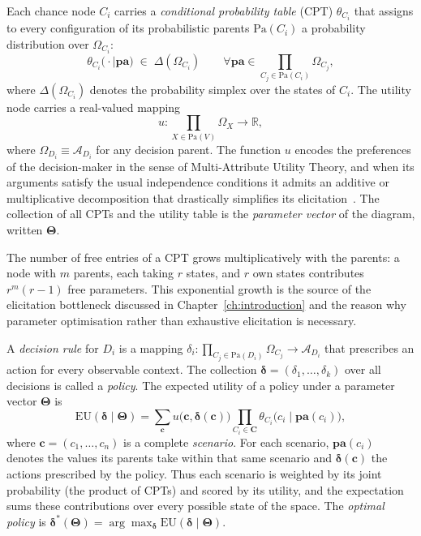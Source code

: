 Each chance node $C_i$ carries a \emph{conditional probability
table} (CPT) $\theta_{C_i}$ that assigns to every configuration of
its probabilistic parents $\mathrm{Pa}(C_i)$ a probability distribution over
$\Omega_{C_i}$:
\[
   \theta_{C_i}\bigl(\cdot \mid \mathbf{pa}\bigr) \;\in\;
   \Delta(\Omega_{C_i})
   \qquad
   \forall \mathbf{pa}\in\prod_{C_j\in\mathrm{Pa}(C_i)}\Omega_{C_j},
\]
where $\Delta(\Omega_{C_i})$ denotes the probability simplex over the
states of $C_i$. The utility node carries a real-valued mapping
\[
   u : \prod_{X\in\mathrm{Pa}(V)}\Omega_X \longrightarrow \mathbb{R},
\]
where $\Omega_{D_i}\equiv\mathcal{A}_{D_i}$ for any decision parent.
The function $u$ encodes the preferences of the decision-maker in
the sense of Multi-Attribute Utility Theory, and when its arguments
satisfy the usual independence conditions it admits an additive or
multiplicative decomposition that drastically simplifies its
elicitation~\cite{riosinsua2002maut}. The collection of all CPTs
and the utility table is the \emph{parameter vector} of the
diagram, written $\boldsymbol{\Theta}$.

\begin{remark}
\label{rem:explosion}
The number of free entries of a CPT grows multiplicatively with the
parents: a node with $m$ parents, each taking $r$ states, and $r$
own states contributes $r^{m}(r-1)$ free parameters. This
exponential growth is the source of the elicitation bottleneck
discussed in Chapter~\ref{ch:introduction} and the reason why
parameter optimisation rather than exhaustive elicitation is
necessary.
\end{remark}

A \emph{decision rule} for $D_i$ is a mapping
$\delta_i : \prod_{C_j\in\mathrm{Pa}(D_i)}\Omega_{C_j}
\longrightarrow \mathcal{A}_{D_i}$
that prescribes an action for every observable context. The
collection $\boldsymbol{\delta}=(\delta_1,\ldots,\delta_k)$ over all
decisions is called a \emph{policy}. The expected utility of a
policy under a parameter vector $\boldsymbol{\Theta}$ is
\begin{equation}
\label{eq:eu}
   \mathrm{EU}(\boldsymbol{\delta}\mid\boldsymbol{\Theta}) =
   \sum_{\mathbf{c}} u\!\bigl(\mathbf{c},
                              \boldsymbol{\delta}(\mathbf{c})\bigr)
   \prod_{C_i\in\mathbf{C}}
   \theta_{C_i}\!\bigl(c_i \mid \mathbf{pa}(c_i)\bigr),
\end{equation}
where $\mathbf{c}=(c_1,\ldots,c_n)$ is a complete \emph{scenario}. For each scenario,
$\mathbf{pa}(c_i)$ denotes the values its parents take within that same
scenario and $\boldsymbol{\delta}(\mathbf{c})$ the actions prescribed
by the policy. Thus each scenario is weighted by its joint probability
(the product of CPTs) and scored by its utility, and the expectation
sums these contributions over every possible state of the space.
The \emph{optimal policy} is
$\boldsymbol{\delta}^{\!*}(\boldsymbol{\Theta}) =
\arg\max_{\boldsymbol{\delta}}
\mathrm{EU}(\boldsymbol{\delta}\mid\boldsymbol{\Theta})$.

